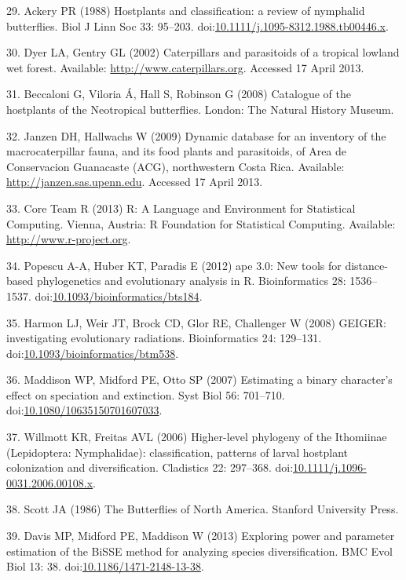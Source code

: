 \documentclass[10pt]{article}
\begin{document}
29. Ackery PR (1988) Hostplants and classification: a review of
nymphalid butterflies. Biol J Linn Soc 33: 95--203.
doi:\href{http://dx.doi.org/10.1111/j.1095-8312.1988.tb00446.x}{10.1111/j.1095-8312.1988.tb00446.x}.

30. Dyer LA, Gentry GL (2002) Caterpillars and parasitoids of a tropical
lowland wet forest. Available: \url{http://www.caterpillars.org}.
Accessed 17 April 2013.

31. Beccaloni G, Viloria \'A, Hall S, Robinson G (2008) Catalogue of the
hostplants of the Neotropical butterflies. London: The Natural History
Museum.

32. Janzen DH, Hallwachs W (2009) Dynamic database for an inventory of
the macrocaterpillar fauna, and its food plants and parasitoids, of Area
de Conservacion Guanacaste (ACG), northwestern Costa Rica. Available:
\url{http://janzen.sas.upenn.edu}. Accessed 17 April 2013.

33. Core Team R (2013) R: A Language and Environment for Statistical
Computing. Vienna, Austria: R Foundation for Statistical Computing.
Available: \url{http://www.r-project.org}.

34. Popescu A-A, Huber KT, Paradis E (2012) ape 3.0: New tools for
distance-based phylogenetics and evolutionary analysis in R.
Bioinformatics 28: 1536--1537.
doi:\href{http://dx.doi.org/10.1093/bioinformatics/bts184}{10.1093/bioinformatics/bts184}.

35. Harmon LJ, Weir JT, Brock CD, Glor RE, Challenger W (2008) GEIGER:
investigating evolutionary radiations. Bioinformatics 24: 129--131.
doi:\href{http://dx.doi.org/10.1093/bioinformatics/btm538}{10.1093/bioinformatics/btm538}.

36. Maddison WP, Midford PE, Otto SP (2007) Estimating a binary
character's effect on speciation and extinction. Syst Biol 56: 701--710.
doi:\href{http://dx.doi.org/10.1080/10635150701607033}{10.1080/10635150701607033}.

37. Willmott KR, Freitas AVL (2006) Higher-level phylogeny of the
Ithomiinae (Lepidoptera: Nymphalidae): classification, patterns of
larval hostplant colonization and diversification. Cladistics 22:
297--368.
doi:\href{http://dx.doi.org/10.1111/j.1096-0031.2006.00108.x}{10.1111/j.1096-0031.2006.00108.x}.

38. Scott JA (1986) The Butterflies of North America. Stanford
University Press.

39. Davis MP, Midford PE, Maddison W (2013) Exploring power and
parameter estimation of the BiSSE method for analyzing species
diversification. BMC Evol Biol 13: 38.
doi:\href{http://dx.doi.org/10.1186/1471-2148-13-38}{10.1186/1471-2148-13-38}.
\end{document}
